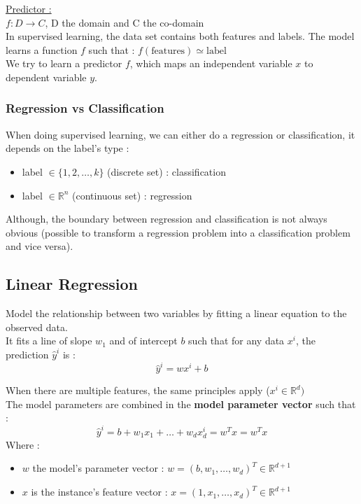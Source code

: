 \documentclass[../main.tex]{subfiles}
\begin{document}
\quad \underline{Predictor :}\\
$f:D\rightarrow C$, D the domain and C the co-domain\\
In supervised learning, the data set contains both features and labels. The model learns a function $f$ such that : $f(\text{features}) \simeq \text{label}$\\
We try to learn a predictor $f$, which maps an independent variable $x$ to dependent variable $y$.\\

\subsubsection{Regression vs Classification}
When doing supervised learning, we can either do a regression or classification, it depends on the label's type : \begin{itemize}
    \item label $\in \{1,2,\dots, k\}$ (discrete set) : classification\\
    \item label $\in \mathbb{R}^n$ (continuous set) : regression\\
\end{itemize}
Although, the boundary between regression and classification is not always obvious (possible to transform a regression problem into a classification problem and vice versa).\\

\subsection{Linear Regression}
Model the relationship between two variables by fitting a linear equation to the observed data.\\

It fits a line of slope $w_1$ and of intercept $b$ such that for any data $x^i$, the prediction $\hat{y}^i$ is : \begin{equation}
    \hat{y}^i = wx^i+b
\end{equation}

When there are multiple features, the same principles apply ($x^i \in \mathbb{R}^d)$\\

The model parameters are combined in the \textbf{model parameter vector} such that : \begin{equation}
    \hat{y}^i = b+ w_1x_1 + \dots+w_d x_d^i = w^T x = w^Tx
\end{equation}
Where : \begin{itemize}
    \item $w$ the model's parameter vector : $w = (b, w_1, \dots, w_d)^T \in \mathbb{R}^{d+1}$\\
    \item $x$ is the instance's feature vector : $x=(1,x_1,\dots, x_d)^T \in \mathbb{R}^{d+1}$\\
\end{itemize}
\end{document}

